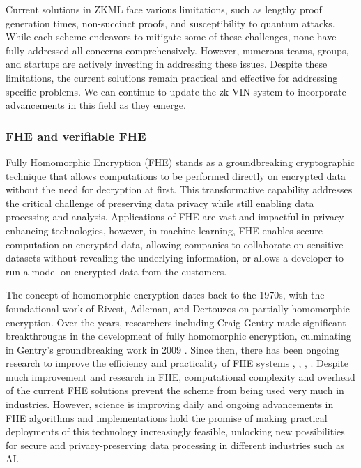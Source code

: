 \documentclass[conference]{IEEEtran}
\begin{document}
Current solutions in ZKML face various limitations, such as lengthy proof generation times, non-succinct proofs, and susceptibility to quantum attacks. While each scheme endeavors to mitigate some of these challenges, none have fully addressed all concerns comprehensively. However, numerous teams, groups, and startups are actively investing in addressing these issues. Despite these limitations, the current solutions remain practical and effective for addressing specific problems. We can continue to update the zk-VIN system to incorporate advancements in this field as they emerge.

\subsubsection{FHE and verifiable FHE}

Fully Homomorphic Encryption (FHE) stands as a groundbreaking cryptographic technique that allows computations to be performed directly on encrypted data without the need for decryption at first. This transformative capability addresses the critical challenge of preserving data privacy while still enabling data processing and analysis. Applications of FHE are vast and impactful in privacy-enhancing technologies, however, in machine learning, FHE enables secure computation on encrypted data, allowing companies to collaborate on sensitive datasets without revealing the underlying information, or allows a developer to run a model on encrypted data from the customers.

The concept of homomorphic encryption dates back to the 1970s, with the foundational work of Rivest, Adleman, and Dertouzos on partially homomorphic encryption. Over the years, researchers including Craig Gentry made significant breakthroughs in the development of fully homomorphic encryption, culminating in Gentry’s groundbreaking work in 2009 \cite{Gentry2009FullyHE}. Since then, there has been ongoing research to improve the efficiency and practicality of FHE systems \cite{Dijk2010FullyHE}, \cite{Brakerski2012LeveledFH}, \cite{Gentry2013HomomorphicEF}, \cite{Cheon2017HomomorphicEF}. Despite much improvement and research in FHE, computational complexity and overhead of the current FHE solutions prevent the scheme from being used very much in industries. However, science is improving daily and ongoing advancements in FHE algorithms and implementations hold the promise of making practical deployments of this technology increasingly feasible, unlocking new possibilities for secure and privacy-preserving data processing in different industries such as AI.
\end{document}
